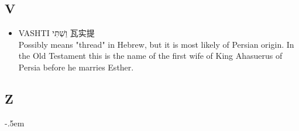 \subsection{V}
\begin{itemize}
\itemsep-.5em 
\item VASHTI וַשְׁתִּי 瓦实提 \\
Possibly means "thread" in Hebrew, but it is most likely of Persian origin. In the Old Testament this is the name of the first wife of King Ahasuerus of Persia before he marries Esther.
\end{itemize}

\subsection{Z}
\begin{itemize}
\itemsep-.5em 


\end{itemize}
